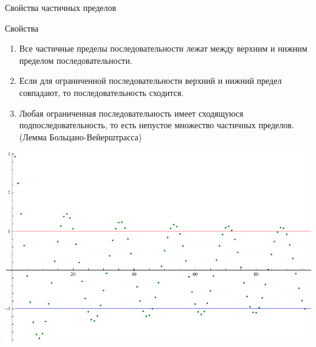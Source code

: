 \documentclass[8pt]{beamer}
\begin{document}
\begin{frame}{Свойства частичных пределов}
\begin{block}{Свойства}
\begin{enumerate}
\item Все частичные пределы последовательности лежат между верхним и нижним пределом последовательности.
\item Если для ограниченной последовательности верхний и нижний предел совпадают, то последовательность сходится.
\item Любая ограниченная последовательность имеет сходящуюся подпоследовательность, то есть непустое множество частичных пределов. (Лемма Больцано-Вейерштрасса)
\end{enumerate}
\end{block}
\begin{center}
\includegraphics[scale=0.5]{limsup.pdf}
\end{center}
\end{frame}
\end{document}
